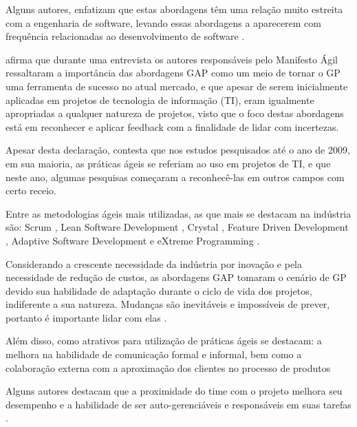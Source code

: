 Alguns autores, enfatizam que estas abordagens têm uma relação muito estreita com a engenharia de software, levando essas abordagens a aparecerem com frequência relacionadas ao desenvolvimento de software \cite{aguanno2004101, boehm1988spiral, beck2001manifesto, williams2005assessing}.

 afirma que durante uma entrevista os autores responsáveis pelo Manifesto Ágil ressaltaram a importância das abordagens GAP como um meio de tornar o GP uma ferramenta de sucesso no atual mercado, e que apesar de serem inicialmente aplicadas em projetos de tecnologia de informação (TI), eram igualmente apropriadas a qualquer natureza de projetos, visto que o foco destas abordagens está em reconhecer e aplicar feedback com a finalidade de lidar com incertezas.

Apesar desta declaração,  contesta que nos estudos pesquisados até o ano de 2009, em sua maioria, as práticas ágeis se referiam ao uso em projetos de TI, e que neste ano, algumas pesquisas começaram a reconhecê-las em outros campos com certo receio.

Entre as metodologias ágeis mais utilizadas, as que mais se destacam na indústria são: Scrum \cite{schwaber2004agile}, Lean Software Development \cite{poppendieck2007lean}, Crystal \cite{cockburn2004crystal}, Feature Driven Development \cite{palmer2001practical}, Adaptive Software Development \cite{highsmith2001agile} e eXtreme Programming \cite{beck2000extreme}.

Considerando a crescente necessidade da indústria por inovação e pela necessidade de redução de custos, as abordagens GAP tomaram o cenário de GP devido sua habilidade de adaptação durante o ciclo de vida dos projetos, indiferente a sua natureza. Mudanças são inevitáveis e impossíveis de prever, portanto é importante lidar com elas \cite{aguanno2004101, amaral2011gerenciamento,chin2004agile, decarlo2010extreme, highsmith2009agile, leffingwell2007scaling, williams2005assessing}.

Além disso, como atrativos para utilização de práticas ágeis se destacam: a melhora na habilidade de comunicação formal e informal, bem como a colaboração externa com a aproximação dos clientes no processo de produtos \cite{aguanno2004101, cockburn2006agile, collyer2010aim, coram2005impact, decarlo2010extreme, highsmith2001agile, williams2005assessing}

Alguns autores destacam que a proximidade do time com o projeto melhora seu desempenho e a habilidade de ser auto-gerenciáveis e responsáveis em suas tarefas \cite{augustine2005managing, boehm2004balancing, highsmith2009agile}.


